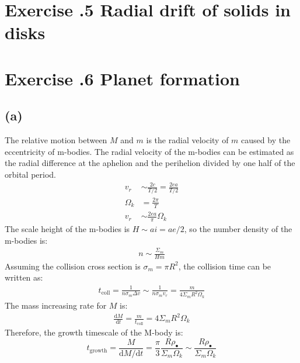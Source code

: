 \documentclass[a4paper,12pt]{article}
\renewcommand{\d}{\mathrm{d}}
\begin{document}
\section*{\textbf{Exercise \uppercase\expandafter{}.5 Radial drift of solids in disks}}


\section*{\textbf{Exercise \uppercase\expandafter{}.6 Planet formation}}
\subsection*{(a)}
The relative motion between $M$ and $m$ is the radial velocity of $m$ caused by the eccentricity of m-bodies.
The radial velocity of the m-bodies can be estimated as the radial difference at the aphelion and the  perihelion 
divided by one half of the orbital period.
\begin{align*}
    v_r &\sim  \frac{2c}{T/2} = \frac{2ea}{T/2} \\
    \Omega_k &= \frac{2\pi}{T} \\
    v_r &\sim \frac{2ea}{\pi } \Omega_k
\end{align*}
The scale height of the m-bodies is $H \sim ai = ae/2$, so the number density of the m-bodies is:
\begin{align*}
    n \sim \frac{\Sigma_m}{H m}
\end{align*}
Assuming the collision cross section is $\sigma_m = \pi R^2$, the collision time can be written as:
\begin{align*}
    t_\text{coll} = \frac{1}{n\sigma_m \Delta v} \sim \frac{1}{n\sigma_m v_r} = \frac{m}{4\Sigma_m R^2 \Omega_k}
\end{align*}
The mass increasing rate for $M$ is:
\begin{align*}
    \frac{\d M}{\d t} = \frac{m}{t_\text{coll}} = 4 \Sigma_m R^2 \Omega_k
\end{align*}
Therefore, the growth timescale of the M-body is:
\begin{equation*}
    t_\text{growth} = \frac{M}{\d M/\d t} = \frac{\pi}{3} \frac{R \rho_\bullet }{\Sigma_m \Omega_k} \sim \frac{R \rho_\bullet }{\Sigma_m \Omega_k}
\end{equation*}
\end{document}
